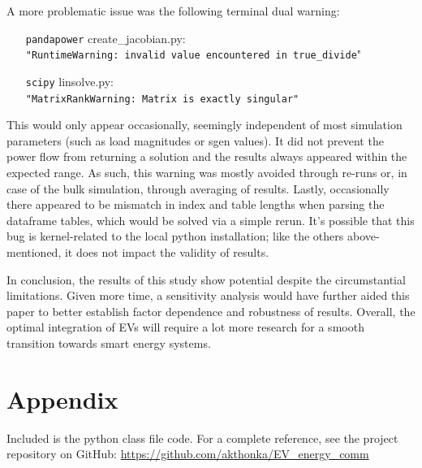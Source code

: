 \documentclass[a4paper,10pt]{report}
\begin{document}
A more problematic issue was the following terminal dual warning:
\noindent
\begin{itemize}[leftmargin=2.1cm]
	\item[\texttt{pandapower}] create\_jacobian.py:\\
	\texttt{"RuntimeWarning: invalid value encountered in true\_divide}"
	\item[\texttt{scipy}] linsolve.py:\\
	\texttt{"MatrixRankWarning: Matrix is exactly singular"}
\end{itemize}
This would only appear occasionally, seemingly independent of most simulation parameters (such as load magnitudes or sgen values). It did not prevent the power flow from returning a solution and the results always appeared within the expected range. As such, this warning was mostly avoided through re-runs or, in case of the bulk simulation, through averaging of results. Lastly, occasionally there appeared to be mismatch in index and table lengths when parsing the dataframe tables, which would be solved via a simple rerun. It's possible that this bug is kernel-related to the local python installation; like the others above-mentioned, it does not impact the validity of results.

In conclusion, the results of this study show potential despite the circumstantial limitations. Given more time, a sensitivity analysis would have further aided this paper to better establish factor dependence and robustness of results. Overall, the optimal integration of EVs will require a lot more research for a smooth transition towards smart energy systems.



\chapter*{Appendix}\label{chapter_appendix}
\pagestyle{empty}

Included is the python class file code. For a complete reference, see the project repository on GitHub: \url{https://github.com/akthonka/EV_energy_comm}


\end{document}
